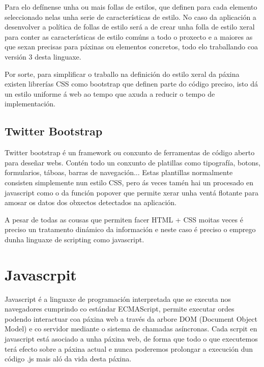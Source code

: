         Para elo defínense unha ou mais follas de estilos, que definen para cada elemento 
        seleccionado nelas unha serie de características de estilo. No caso da aplicación a 
        desenvolver a política de follas de estilo será a de crear unha folla de estilo xeral para 
        conter as características de estilo comúns a todo o proxecto e a maiores as que sexan 
        precisas para páxinas ou elementos concretos, todo elo traballando coa versión 3 desta linguaxe.
    
        Por sorte, para simplificar o traballo na definición do estilo xeral da páxina existen 
        librerías CSS como bootstrap que definen parte do código preciso, isto dá un estilo 
        uniforme á web ao tempo que axuda a reducir o tempo de implementación.
        
        \subsection{Twitter Bootstrap}
            Twitter bootstrap é un framework ou conxunto de ferramentas de código aberto para 
            deseñar webs. Contén todo un conxunto de platillas como tipografía, botons, formularios,
            táboas, barras de navegación... Estas plantillas normalmente consisten simplemente nun
            estilo CSS, pero ás veces tamén hai un procesado en javascript como o da función popover
            que permite xerar unha ventá flotante para amosar os datos dos obxectos detectados na 
            aplicación.
            
            A pesar de todas as cousas que permiten facer HTML + CSS moitas veces é preciso un 
            tratamento dinámico da información e neste caso é preciso o emprego dunha linguaxe de 
            scripting como javascript.
    
    \section{Javascrpit}
        Javascript é a linguaxe de programación interpretada que se executa nos navegadores
        cumprindo co estándar ECMAScript, permite executar ordes podendo interactuar coa páxina 
        web a través da arbore DOM (Document Object Model) e co servidor mediante o sistema de
        chamadas asíncronas. Cada scrpit en javascript está asociado a unha páxina web, de forma
        que todo o que executemos terá efecto sobre a páxina actual e nunca poderemos prolongar
        a execución dun código .js mais aló da vida desta páxina.\\
        
